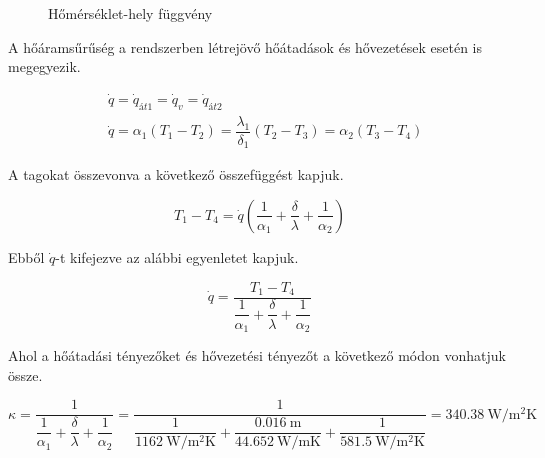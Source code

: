 \begin{figure}[h]
	\caption{Hőmérséklet-hely függvény}
\end{figure}

\noindent A hőáramsűrűség a rendszerben létrejövő hőátadások és hővezetések esetén is megegyezik. 

\begin{equation}\label{e:mdpm86_elso}
\begin{split}
&\dot{q}=\dot{q}_{\textit{át1}} =\dot{q}_v=\dot{q}_{\textit{át2}}\\&\dot{q}=\alpha_1 (T_1-T_2)= \dfrac{\lambda_1}{\delta_1} (T_2 - T_3) = \alpha_2 (T_3-T_4)
\end{split}
\end{equation} 

\noindent A tagokat összevonva a következő összefüggést kapjuk.

\begin{equation}
T_1-T_4=\dot{q}\left(\dfrac{1}{\alpha_1}+\dfrac{\delta}{\lambda}+\dfrac{1}{\alpha_2}\right)
\end{equation} 

\noindent Ebből $\dot{q}$-t kifejezve az alábbi egyenletet kapjuk.

\begin{equation}
\dot{q}=\dfrac{T_1-T_4}{\dfrac{1}{\alpha_1}+\dfrac{\delta}{\lambda}+\dfrac{1}{\alpha_2}}
\end{equation} 

\noindent Ahol a hőátadási tényezőket és hővezetési tényezőt a következő módon vonhatjuk össze.

\begin{equation}
\kappa=\dfrac{1}{\dfrac{1}{\alpha_1}+\dfrac{\delta}{\lambda}+\dfrac{1}{\alpha_2}}=\dfrac{1}{\dfrac{1}{\SI{1162}{\watt\per\meter\squared\kelvin}}+\dfrac{\SI{0,016}{\meter}}{\SI{44,652}{\watt\per\meter\kelvin}}+\dfrac{1}{\SI{581,5}{\watt\per\meter\squared\kelvin}}}=\SI{340,38}{\watt\per\meter\squared\kelvin}
\end{equation} 

